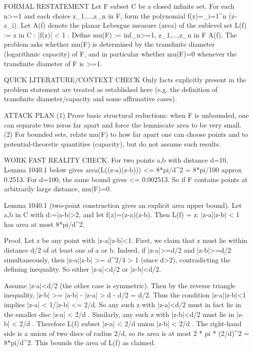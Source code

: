 FORMAL RESTATEMENT
Let F subset C be a closed infinite set. For each n>=1 and each choice z_1,...,z_n in F, form the polynomial f(z)=\prod_{i=1}^n (z-z_i).
Let A(f) denote the planar Lebesgue measure (area) of the sublevel set
  L(f) := { z in C : |f(z)| < 1 }.
Define
  mu(F) := inf_{n>=1, z_1,...,z_n in F} A(f).
The problem asks whether mu(F) is determined by the transfinite diameter (logarithmic capacity) of F, and in particular whether mu(F)=0 whenever the transfinite diameter of F is >=1.

QUICK LITERATURE/CONTEXT CHECK
Only facts explicitly present in the problem statement are treated as established here (e.g. the definition of transfinite diameter/capacity and some affirmative cases).

ATTACK PLAN
(1) Prove basic structural reductions: when F is unbounded, one can separate two zeros far apart and force the lemniscate area to be very small.
(2) For bounded sets, relate mu(F) to how far apart one can choose points and to potential-theoretic quantities (capacity), but do not assume such results.

WORK
FAST REALITY CHECK.
For two points a,b with distance d=10, Lemma 1040.1 below gives area(L((z-a)(z-b))) <= 8*pi/d^2 = 8*pi/100 approx 0.2513.
For d=100, the same bound gives <= 0.002513.
So if F contains points at arbitrarily large distance, mu(F)=0.

Lemma 1040.1 (two-point construction gives an explicit area upper bound).
Let a,b in C with d:=|a-b|>2, and let f(z)=(z-a)(z-b).
Then
  L(f) = { z: |z-a||z-b| < 1 }
has area at most 8*pi/d^2.

Proof.
Let z be any point with |z-a||z-b|<1.
First, we claim that z must lie within distance d/2 of at least one of a or b.
Indeed, if |z-a|>=d/2 and |z-b|>=d/2 simultaneously, then |z-a||z-b| >= d^2/4 > 1 (since d>2), contradicting the defining inequality.
So either |z-a|<d/2 or |z-b|<d/2.

Assume |z-a|<d/2 (the other case is symmetric). Then by the reverse triangle inequality,
  |z-b| >= |a-b| - |z-a| > d - d/2 = d/2.
Thus the condition |z-a||z-b|<1 implies
  |z-a| < 1/|z-b| <= 2/d.
So any such z with |z-a|<d/2 must in fact lie in the smaller disc { |z-a| < 2/d }.
Similarly, any such z with |z-b|<d/2 must lie in { |z-b| < 2/d }.
Therefore
  L(f) subset { |z-a| < 2/d } union { |z-b| < 2/d }.
The right-hand side is a union of two discs of radius 2/d, so its area is at most
  2 * pi * (2/d)^2 = 8*pi/d^2.
This bounds the area of L(f) as claimed.

